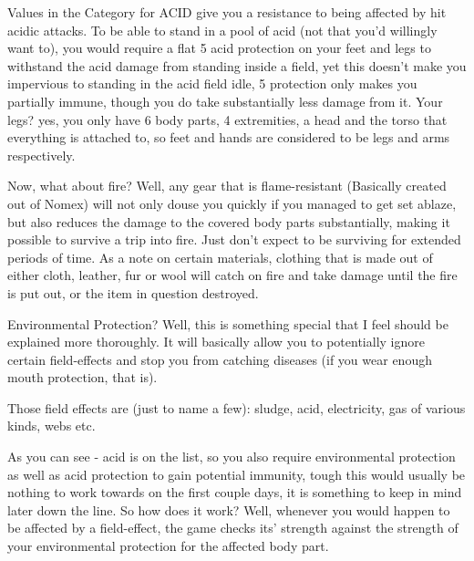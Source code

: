 \documentclass[11pt]{report}
\begin{document}
Values in the Category for ACID give you a resistance to being affected by hit acidic attacks. To be able to stand in a pool of acid (not that you'd willingly want to), you would require a flat 5 acid protection on your feet and legs to withstand the acid damage from standing inside a field, yet this doesn't make you impervious to standing in the acid field idle, 5 protection only makes you partially immune, though you do take substantially less damage from it.
Your legs? yes, you only have 6 body parts, 4 extremities, a head and the torso that everything is attached to, so feet and hands are considered to be legs and arms respectively.

Now, what about fire? Well, any gear that is flame-resistant (Basically created out of Nomex) will not only douse you quickly if you managed to get set ablaze, but also reduces the damage to the covered body parts substantially, making it possible to survive a trip into fire. Just don't expect to be surviving for extended periods of time.
As a note on certain materials, clothing that is made out of either cloth, leather, fur or wool will catch on fire and take damage until the fire is put out, or the item in question destroyed.

Environmental Protection? Well, this is something special that I feel should be explained more thoroughly. It will basically allow you to potentially ignore certain field-effects and stop you from catching diseases (if you wear enough mouth protection, that is).

Those field effects are (just to name a few): sludge, acid, electricity, gas of various kinds, webs etc.

As you can see - acid is on the list, so you also require environmental protection as well as acid protection to gain potential immunity, tough this would usually be nothing to work towards on the first couple days, it is something to keep in mind later down the line.
So how does it work?
Well, whenever you would happen to be affected by a field-effect, the game checks its' strength against the strength of your environmental protection for the affected body part.
\end{document}
